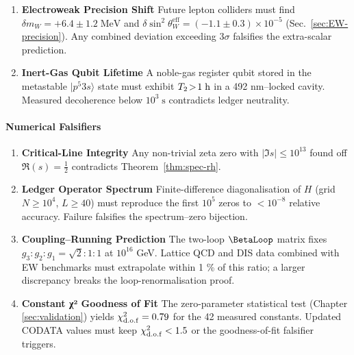 \documentclass[11pt,oneside]{book}
\begin{document}
{\begin{enumerate}
\item \textbf{Electroweak Precision Shift}  
      Future lepton colliders must find
      $\delta m_{W}=+6.4\pm1.2\;\text{MeV}$ and
      $\delta\sin^{2}\!\theta_{W}^{\text{eff}}
        =(-1.1\pm0.3)\times10^{-5}$
      (Sec.~\ref{sec:EW-precision}).
      Any combined deviation exceeding $3\sigma$
      falsifies the extra-scalar prediction.

\item \textbf{Inert-Gas Qubit Lifetime}  
      A noble-gas register qubit stored in the
      metastable $|p^{5}3s\rangle$ state must exhibit
      $T_{2}\!>\!1\;{\rm h}$ in a 492 nm–locked cavity.
      Measured decoherence below $10^{3}\;\text{s}$
      contradicts ledger neutrality.

\end{enumerate}

\paragraph{Numerical Falsifiers}

\begin{enumerate}\setlength\itemsep{6pt}

\item \textbf{Critical-Line Integrity}  
      Any non-trivial zeta zero with
      $|\Im s|\le10^{13}$ found off
      $\Re(s)=\tfrac12$ contradicts
      Theorem~\ref{thm:spec-rh}.

\item \textbf{Ledger Operator Spectrum}  
      Finite-difference diagonalisation of $H$
      (grid $N\ge10^{4}$, $L\ge40$)
      must reproduce the first $10^{5}$ zeros
      to $<10^{-8}$ relative accuracy.
      Failure falsifies the spectrum–zero bijection.

\item \textbf{Coupling–Running Prediction}  
      The two-loop $\BetaLoop$ matrix fixes
      $g_{3}:g_{2}:g_{1}=\sqrt2:1:1$ at $10^{16}$ GeV.
      Lattice QCD and DIS data combined with
      EW benchmarks must extrapolate within
      1 \% of this ratio; a larger discrepancy
      breaks the loop-renormalisation proof.

\item \textbf{Constant χ² Goodness of Fit}  
      The zero-parameter statistical test
      (Chapter \ref{sec:validation}) yields
      $\chi^{2}_{\rm d.o.f}=0.79$ for the
      42 measured constants.
      Updated CODATA values must keep
      $\chi^{2}_{\rm d.o.f}<1.5$ or the
      goodness-of-fit falsifier triggers.


\end{enumerate}}
\end{document}
